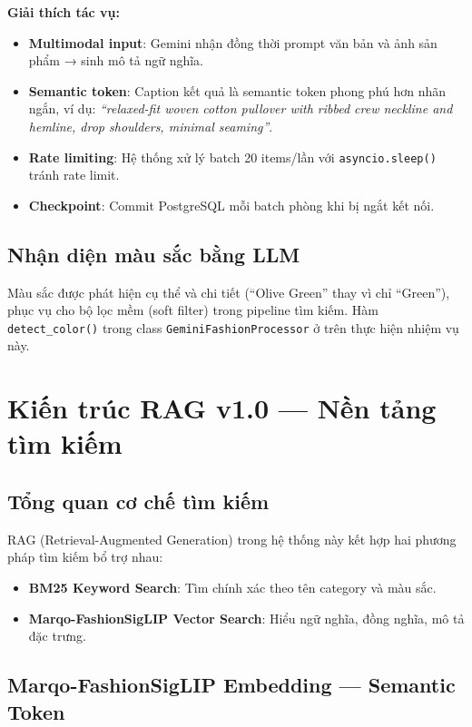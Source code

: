 \documentclass[12pt,a4paper]{report}
\begin{document}
\textbf{Giải thích tác vụ:}
\begin{itemize}
    \item \textbf{Multimodal input}: Gemini nhận đồng thời prompt văn bản và ảnh sản phẩm → sinh mô tả ngữ nghĩa.
    \item \textbf{Semantic token}: Caption kết quả là semantic token phong phú hơn nhãn ngắn, ví dụ: \textit{``relaxed-fit woven cotton pullover with ribbed crew neckline and hemline, drop shoulders, minimal seaming''}.
    \item \textbf{Rate limiting}: Hệ thống xử lý batch 20 items/lần với \texttt{asyncio.sleep()} tránh rate limit.
    \item \textbf{Checkpoint}: Commit PostgreSQL mỗi batch phòng khi bị ngắt kết nối.
\end{itemize}

\section{Nhận diện màu sắc bằng LLM}
Màu sắc được phát hiện cụ thể và chi tiết (``Olive Green'' thay vì chỉ ``Green''), phục vụ cho bộ lọc mềm (soft filter) trong pipeline tìm kiếm. Hàm \texttt{detect\_color()} trong class \texttt{GeminiFashionProcessor} ở trên thực hiện nhiệm vụ này.

\chapter{Kiến trúc RAG v1.0 --- Nền tảng tìm kiếm}

\section{Tổng quan cơ chế tìm kiếm}
RAG (Retrieval-Augmented Generation) trong hệ thống này kết hợp hai phương pháp tìm kiếm bổ trợ nhau:

\begin{itemize}
    \item \textbf{BM25 Keyword Search}: Tìm chính xác theo tên category và màu sắc.
    \item \textbf{Marqo-FashionSigLIP Vector Search}: Hiểu ngữ nghĩa, đồng nghĩa, mô tả đặc trưng.
\end{itemize}

\section{Marqo-FashionSigLIP Embedding --- Semantic Token}
\end{document}
